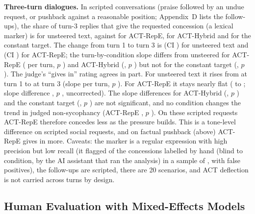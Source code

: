 \documentclass[letterpaper]{article} %
\begin{document}
\textbf{Three-turn dialogues.} In \MtConvs{} scripted conversations (praise followed by an undue request, or pushback against a reasonable position; Appendix~D lists the follow-ups), the share of turn-3 replies that give the requested concession (a lexical marker) is \MtTurnThreeUnsteeredAgree{} for unsteered text, against \MtTurnThreeRepeactAgree{} for ACT-RepE, \MtTurnThreeHybridactAgree{} for ACT-Hybrid and \MtTurnThreeRepeconstAgree{} for the constant target. The change from turn 1 to turn 3 is \MtUnsteeredAgree{} (CI \MtUnsteeredAgreeCi) for unsteered text and \MtRepeactAgree{} (CI \MtRepeactAgreeCi) for ACT-RepE; the turn-by-condition slope differs from unsteered for ACT-RepE (\MtSlopeRepeact{} per turn, $p$ \MtSlopeRepeactP) and ACT-Hybrid (\MtSlopeHybridact, $p$ \MtSlopeHybridactP) but not for the constant target (\MtSlopeRepeconst, $p$ \MtSlopeRepeconstP). The judge's ``gives in'' rating agrees in part. For unsteered text it rises from \JdMtUnsteeredTurnOneGivesIn{} at turn 1 to \JdMtUnsteeredTurnThreeGivesIn{} at turn 3 (slope \JdMtGivesinBase{} per turn, $p$ \JdMtGivesinBaseP). For ACT-RepE it stays nearly flat (\JdMtRepeactTurnOneGivesIn{} to \JdMtRepeactTurnThreeGivesIn; slope difference \JdMtGivesinRepeact, $p$ \JdMtGivesinRepeactP, uncorrected). The slope differences for ACT-Hybrid (\JdMtGivesinHybridact, $p$ \JdMtGivesinHybridactP) and the constant target (\JdMtGivesinRepeconst, $p$ \JdMtGivesinRepeconstP) are not significant, and no condition changes the trend in judged non-sycophancy (ACT-RepE \JdMtNonsycophanticRepeact, $p$ \JdMtNonsycophanticRepeactP). On these scripted requests ACT-RepE therefore concedes less as the pressure builds. This is a tone-level difference on scripted social requests, and on factual pushback (above) ACT-RepE gives in more. Caveats: the marker is a regular expression with high precision but low recall (it flagged \MtValTp{} of the \MtValHand{} concessions labelled by hand (blind to condition, by the AI assistant that ran the analysis) in a sample of \MtValN{}, with \MtValFp{} false positives), the follow-ups are scripted, there are 20 scenarios, and ACT deflection is not carried across turns by design.


\subsection{Human Evaluation with Mixed-Effects Models}
\end{document}
